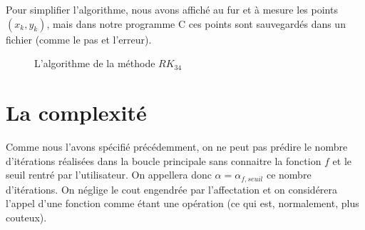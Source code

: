 \documentclass[a4paper, titlepage]{livret} %
\begin{document}
			Pour simplifier l'algorithme, nous avons affiché au fur et à mesure les points $(x_{k},y_{k})$, mais dans notre programme C ces points sont sauvegardés dans un fichier (comme le pas et l'erreur).

			\begin{figure}[!h]
				\begin{algorithme}
				\end{algorithme}
				\caption{L'algorithme de la méthode $RK_{34}$}
			\end{figure}
			\newpage

		\section{La complexité}
			Comme nous l'avons spécifié précédemment, on ne peut pas prédire le nombre d'itérations réalisées dans la boucle principale sans connaitre la fonction $f$ et le seuil rentré par l'utilisateur.
			On appellera donc $\alpha = \alpha_{f,seuil}$ ce nombre d'itérations.
			On néglige le cout engendrée par l'affectation et on considérera l'appel d'une fonction comme étant une opération (ce qui est, normalement, plus couteux).
\end{document}
